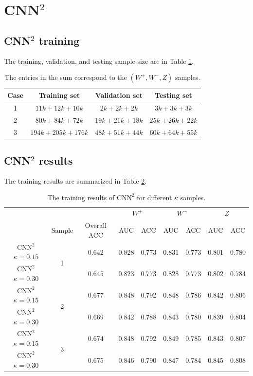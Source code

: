 \documentclass[12pt]{article}
\begin{document}
\section{CNN\texorpdfstring{$^2$}{2}}%
\label{sec:cnn2}
	\subsection{CNN\texorpdfstring{$^2$}{2} training}%
	\label{sub:cnn2_training}
		The training, validation, and testing sample size are in Table \ref{tab:CNNsq_sample_size}.
		\begin{table}[htpb]
			\centering
			\caption{The entries in the sum correspond to the $(W^{+}, W^{-}, Z)$ samples.}
			\label{tab:CNNsq_sample_size}
			\begin{tabular}{c|c|c|c}
			Case & Training set     & Validation set & Testing set   \\ \hline
			1    & $11k+12k+10k$    & $2k+2k+2k$     & $3k+3k+3k$    \\
			2    & $80k+84k+72k$    & $19k+21k+18k$  & $25k+26k+22k$ \\
			3    & $194k+205k+176k$ & $48k+51k+44k$  & $60k+64k+55k$
			\end{tabular}
		\end{table}

	\subsection{CNN\texorpdfstring{$^2$}{2} results}%
	\label{sub:cnn2_results}
		The training results are summarized in Table \ref{tab:CNNsq_training_result}.
		\begin{table}[htpb]
			\centering
			\caption{The training results of $\text{CNN}^2$ for different $\kappa$ samples.}
			\label{tab:CNNsq_training_result}
			\begin{tabular}{c|c|c|cc|cc|cc}
								  &					  &             & \multicolumn{2}{c|}{$W^{+}$} & \multicolumn{2}{c|}{$W^{-}$} & \multicolumn{2}{c}{$Z$} \\
								  & Sample			  & Overall ACC & AUC        & ACC       & AUC        & ACC       & AUC       & ACC       \\ \hline
			$\text{CNN}^2$ $\kappa=0.15$ & \multirow{2}{*}{1}& 0.642 & 0.828 & 0.773 & 0.831 & 0.773 & 0.801 & 0.780 \\
			$\text{CNN}^2$ $\kappa=0.30$ &					 & 0.645 & 0.823 & 0.773 & 0.828 & 0.773 & 0.802 & 0.784 \\ \hline
			$\text{CNN}^2$ $\kappa=0.15$ & \multirow{2}{*}{2}& 0.677 & 0.848 & 0.792 & 0.848 & 0.786 & 0.842 & 0.806 \\
			$\text{CNN}^2$ $\kappa=0.30$ &					 & 0.669 & 0.842 & 0.788 & 0.843 & 0.780 & 0.839 & 0.804 \\ \hline
			$\text{CNN}^2$ $\kappa=0.15$ & \multirow{2}{*}{3}& 0.674 & 0.848 & 0.792 & 0.849 & 0.785 & 0.843 & 0.807 \\
			$\text{CNN}^2$ $\kappa=0.30$ &					 & 0.675 & 0.846 & 0.790 & 0.847 & 0.784 & 0.845 & 0.808 \\
			\end{tabular}
		\end{table}	
		
\end{document}
